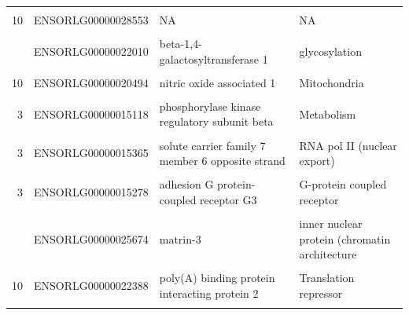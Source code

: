 \documentclass[
]{book}
\begin{document}
\begin{landscape}
\begin{table}
{\begin{tabular}[t]{rlll}
\cellcolor{gray!6}{3} & \cellcolor{gray!6}{ENSORLG00000015260} & \cellcolor{gray!6}{synapse associated protein 1} & \cellcolor{gray!6}{TOR acitivity}\\
10 & ENSORLG00000028553 & NA & NA\\
\cellcolor{gray!6}{3} & \cellcolor{gray!6}{ENSORLG00000015460} & \cellcolor{gray!6}{dpy-19 like C-mannosyltransferase 3} & \cellcolor{gray!6}{glycosylation}\\
\addlinespace
10 & ENSORLG00000022010 & beta-1,4-galactosyltransferase 1 & glycosylation\\
\cellcolor{gray!6}{10} & \cellcolor{gray!6}{ENSORLG00000020498} & \cellcolor{gray!6}{protein NipSnap homolog 3A} & \cellcolor{gray!6}{Mitochondria}\\
10 & ENSORLG00000020494 & nitric oxide associated 1 & Mitochondria\\
\cellcolor{gray!6}{10} & \cellcolor{gray!6}{ENSORLG00000020504} & \cellcolor{gray!6}{ATP-binding cassette sub-family A member 1} & \cellcolor{gray!6}{Metabolism (cholestrol efflux)}\\
3 & ENSORLG00000015118 & phosphorylase kinase regulatory subunit beta & Metabolism\\
\addlinespace
\cellcolor{gray!6}{10} & \cellcolor{gray!6}{ENSORLG00000020493} & \cellcolor{gray!6}{RE1 silencing transcription factor} & \cellcolor{gray!6}{RNA pol II (transcritpion regulation}\\
3 & ENSORLG00000015365 & solute carrier family 7 member 6 opposite strand & RNA pol II (nuclear export)\\
\cellcolor{gray!6}{10} & \cellcolor{gray!6}{ENSORLG00000029052} & \cellcolor{gray!6}{exosome component 3} & \cellcolor{gray!6}{rRNA + RNA binding}\\
3 & ENSORLG00000015278 & adhesion G protein-coupled receptor G3 & G-protein coupled receptor\\
\cellcolor{gray!6}{3} & \cellcolor{gray!6}{ENSORLG00000015287} & \cellcolor{gray!6}{adhesion G-protein coupled receptor G5} & \cellcolor{gray!6}{G-protein coupled receptor}\\
\addlinespace
10 & ENSORLG00000025674 & matrin-3 & inner nuclear protein (chromatin architecture\\
\cellcolor{gray!6}{10} & \cellcolor{gray!6}{ENSORLG00000023325} & \cellcolor{gray!6}{matrin-3} & \cellcolor{gray!6}{inner nuclear protein (chromatin architecture}\\
10 & ENSORLG00000022388 & poly(A) binding protein interacting protein 2 & Translation repressor\\
\cellcolor{gray!6}{3} & \cellcolor{gray!6}{ENSORLG00000015096} & \cellcolor{gray!6}{integrin alpha FG-GAP repeat containing 1} & \cellcolor{gray!6}{NA possibly T cell activation}\\
\bottomrule
\end{tabular}}
\end{table}
\end{landscape}
\end{document}
